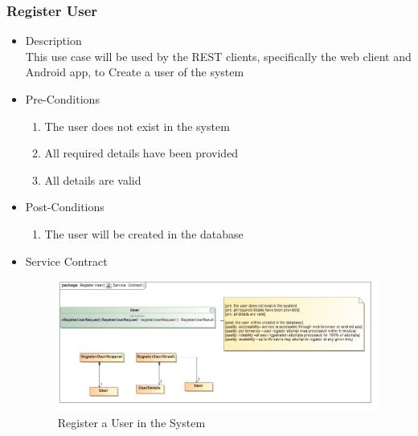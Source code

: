 \documentclass[a4paper,10pt]{article}
\begin{document}
\subsubsection{Register User}
	\begin{itemize}
		\item Description\\
			This use case will be used by the REST clients, specifically the web client and Android app, to Create a user of the system
		\item Pre-Conditions
			\begin{enumerate}
				\item The user does not exist in the system
				\item All required details have been provided
				\item All details are valid
			\end{enumerate}
		\item Post-Conditions
			\begin{enumerate}
				\item The user will be created in the database
						
			\end{enumerate}
		\item Service Contract
			\begin{figure}[H]
				\includegraphics[scale=0.5]{Register_User}
				\caption{Register a User in the System}
			\end{figure}
	\end{itemize}
\end{document}

